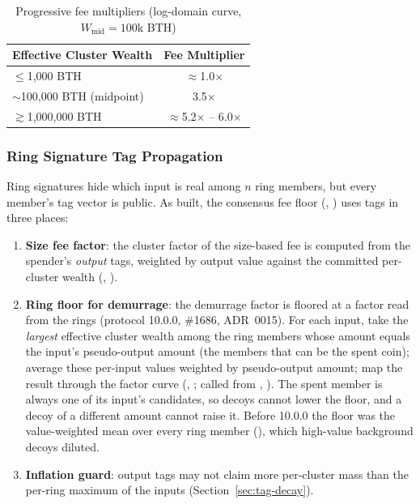 \begin{table}[h]
\centering
\caption{Progressive fee multipliers (log-domain curve, $W_{\text{mid}}=100$k BTH)}
\label{tab:fee-multipliers}
\begin{tabular}{@{}lc@{}}
\toprule
\textbf{Effective Cluster Wealth} & \textbf{Fee Multiplier} \\
\midrule
$\leq$1{,}000 BTH & $\approx$1.0$\times$ \\
$\sim$100{,}000 BTH (midpoint) & 3.5$\times$ \\
$\gtrsim$1{,}000{,}000 BTH & $\approx$5.2$\times$ -- 6.0$\times$ \\
\bottomrule
\end{tabular}
\end{table}



\subsubsection{Ring Signature Tag Propagation}

Ring signatures hide which input is real among $n$ ring members, but every
member's tag vector is public. As built, the consensus fee floor
(,
) uses tags in three
places:

\begin{enumerate}
  \item \textbf{Size fee factor}: the cluster factor of the size-based fee is
    computed from the spender's \emph{output} tags, weighted by output value
    against the committed per-cluster wealth
    (,
    ).
  \item \textbf{Ring floor for demurrage}: the demurrage factor is floored
    at a factor read from the rings (protocol 10.0.0, \#1686, ADR~0015). For
    each input, take the \emph{largest} effective cluster wealth among the
    ring members whose amount equals the input's pseudo-output amount (the
    members that can be the spent coin); average these per-input values
    weighted by pseudo-output amount; map the result through the factor curve
    (,
    ; called from
    , ). The spent
    member is always one of its input's candidates, so decoys cannot lower
    the floor, and a decoy of a different amount cannot raise it. Before
    10.0.0 the floor was the value-weighted mean over every ring member
    (), which high-value background decoys
    diluted.
  \item \textbf{Inflation guard}: output tags may not claim more per-cluster
    mass than the per-ring maximum of the inputs
    (Section~\ref{sec:tag-decay}).
\end{enumerate}

